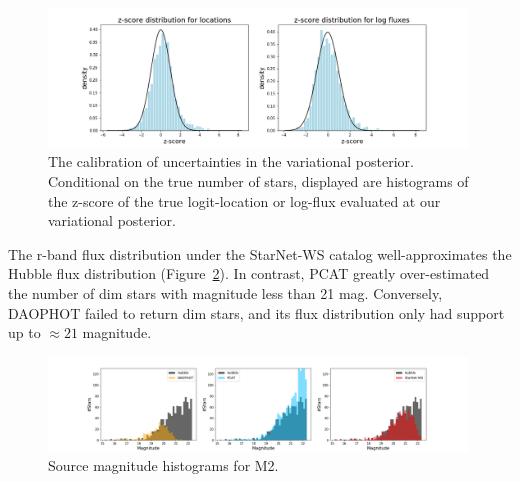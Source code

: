 \begin{figure}[ht]
    \centering
    \includegraphics[width=0.99\textwidth]{figures/z-score_calibration.png}
    \caption{The calibration of uncertainties in the variational posterior. 
    Conditional on the true number of stars, displayed are histograms of the z-score of the true logit-location or log-flux evaluated at our variational posterior. 
}
    \label{fig:z-score_calibration}
\end{figure}

The r-band flux distribution under the StarNet-WS catalog well-approximates the Hubble flux distribution (Figure~\ref{fig:luminosity_fun_m2}). 
In contrast, PCAT greatly over-estimated the number of dim stars with magnitude less than 21 mag. 
Conversely, DAOPHOT failed to return dim stars, and its flux distribution only had support up to $\approx21$ magnitude.

\begin{figure}[ht]
    \centering
    \includegraphics[width=0.99\textwidth]{figures/luminosity_fun.png}
    \caption{Source magnitude histograms for M2. }
    \label{fig:luminosity_fun_m2}
\end{figure}


